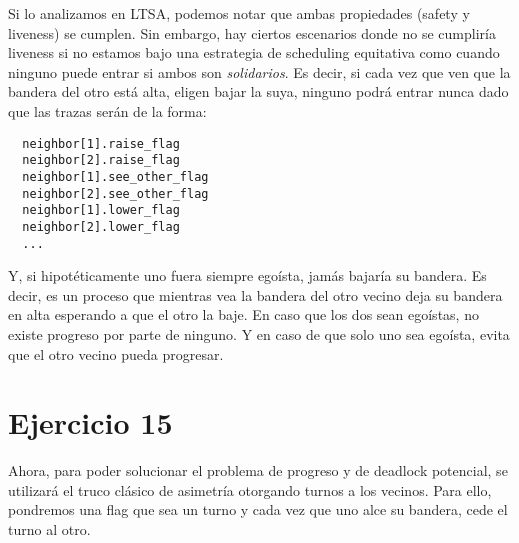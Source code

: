 \documentclass{article}
\begin{document}
Si lo analizamos en LTSA, podemos notar que ambas propiedades (safety y liveness) se cumplen.
Sin embargo, hay ciertos escenarios donde no se cumpliría liveness si no estamos bajo una estrategia de scheduling equitativa como cuando ninguno puede entrar si ambos son \textit{solidarios}.
Es decir, si cada vez que ven que la bandera del otro está alta, eligen bajar la suya, ninguno podrá entrar nunca dado que las trazas serán de la forma:
\begin{verbatim}
  neighbor[1].raise_flag
  neighbor[2].raise_flag 
  neighbor[1].see_other_flag 
  neighbor[2].see_other_flag 
  neighbor[1].lower_flag 
  neighbor[2].lower_flag 
  ...
\end{verbatim}

Y, si hipotéticamente uno fuera siempre egoísta, jamás bajaría su bandera.
Es decir, es un proceso que mientras vea la bandera del otro vecino deja su bandera en alta esperando a que el otro la baje.
En caso que los dos sean egoístas, no existe progreso por parte de ninguno.
Y en caso de que solo uno sea egoísta, evita que el otro vecino pueda progresar.

\section*{Ejercicio 15}
Ahora, para poder solucionar el problema de progreso y de deadlock potencial, se utilizará el truco clásico de asimetría otorgando turnos a los vecinos.
Para ello, pondremos una flag que sea un turno y cada vez que uno alce su bandera, cede el turno al otro.
\end{document}

